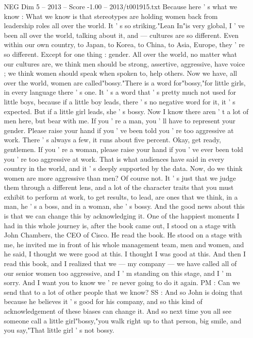 \begin{textsample}{NEG Dim 5 – 2013 – Score -1.00 – 2013/t001915.txt}
Because here ' s what we know : What we know is that stereotypes are holding women back from leadership roles all over the world.
It ' s so striking."Lean In"is very global, I ' ve been all over the world, talking about it, and — cultures are so different.
Even within our own country, to Japan, to Korea, to China, to Asia, Europe, they ' re so different.
Except for one thing : gender.
All over the world, no matter what our cultures are, we think men should be strong, assertive, aggressive, have voice ; we think women should speak when spoken to, help others.
Now we have, all over the world, women are called"bossy."There is a word for"bossy,"for little girls, in every language there ' s one.
It ' s a word that ' s pretty much not used for little boys, because if a little boy leads, there ' s no negative word for it, it ' s expected.
But if a little girl leads, she ' s bossy.
Now I know there aren ' t a lot of men here, but bear with me.
If you ' re a man, you ' ll have to represent your gender.
Please raise your hand if you ' ve been told you ' re too aggressive at work.
There ' s always a few, it runs about five percent.
Okay, get ready, gentlemen.
If you ' re a woman, please raise your hand if you ' ve ever been told you ' re too aggressive at work.
That is what audiences have said in every country in the world, and it ' s deeply supported by the data.
Now, do we think women are more aggressive than men?
Of course not.
It ' s just that we judge them through a different lens, and a lot of the character traits that you must exhibit to perform at work, to get results, to lead, are ones that we think, in a man, he ' s a boss, and in a woman, she ' s bossy.
And the good news about this is that we can change this by acknowledging it.
One of the happiest moments I had in this whole journey is, after the book came out, I stood on a stage with John Chambers, the CEO of Cisco.
He read the book.
He stood on a stage with me, he invited me in front of his whole management team, men and women, and he said, I thought we were good at this.
I thought I was good at this.
And then I read this book, and I realized that we — my company — we have called all of our senior women too aggressive, and I ' m standing on this stage, and I ' m sorry.
And I want you to know we ' re never going to do it again.
PM : Can we send that to a lot of other people that we know?
SS : And so John is doing that because he believes it ' s good for his company, and so this kind of acknowledgement of these biases can change it.
And so next time you all see someone call a little girl"bossy,"you walk right up to that person, big smile, and you say,"That little girl ' s not bossy.

\end{textsample}
